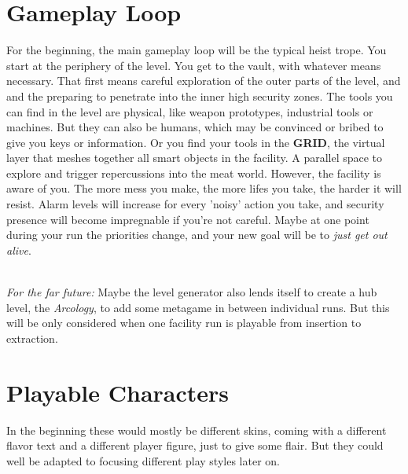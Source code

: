 \documentclass[11pt,a4paper, twocolumn]{article}
\begin{document}
\section{Gameplay Loop}

For the beginning, the main gameplay loop will be the typical heist trope. You start at the periphery of the level.
You get to the vault, with whatever means necessary. That first means careful exploration of the outer parts of the
level, and and the preparing to penetrate into the inner high security zones.
The tools you can find in the level are physical, like weapon prototypes, industrial tools or machines. But they can
also be humans, which may be convinced or bribed to give you keys or information. Or you find your tools in the
\textbf{GRID}, the virtual layer that meshes together all smart objects in the facility. A parallel space to explore
and trigger repercussions into the meat world.
However, the facility is aware of you. The more mess you make, the more lifes you take, the harder it will resist.
Alarm levels will increase for every 'noisy' action you take, and security presence will become impregnable if you're
not careful. Maybe at one point during your run the priorities change, and your new goal will be to
\textit{just get out alive}.\\  \

\textit{For the far future:} Maybe the level generator also lends itself to create a hub level, the \textit{Arcology}, to add
some metagame in between individual runs. But this will be only considered when one facility run is playable from
insertion to extraction.

\section{Playable Characters}

In the beginning these would mostly be different skins, coming with a different flavor text and a different player
figure, just to give some flair. But they could well be adapted to focusing different play styles later on.
\end{document}
